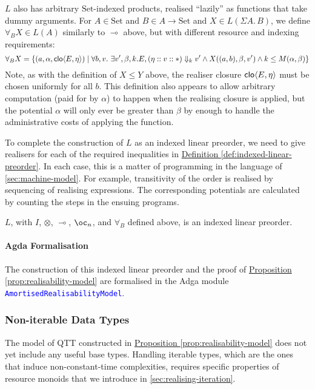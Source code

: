 \documentclass[acmsmall,review,screen,anonymous]{acmart}
\newcommand{\Set}{\mathrm{Set}}
\newcommand{\propref}[1]{\hyperref[#1]{Proposition \ref*{#1}}}
\newcommand{\defref}[1]{\hyperref[#1]{Definition \ref*{#1}}}
\newcommand{\AgdaModule}[1]{\textcolor{blue}{\tt #1}}
\begin{document}
$L$ also has arbitrary $\Set$-indexed products, realised ``lazily'' as
functions that take dummy arguments. For $A \in \Set$ and
$B \in A \to \Set$ and $X \in L(\Sigma A.\,B)$, we define
$\forall_B X \in L(A)$ similarly to $\multimap$ above, but with
different resource and indexing requirements:
\begin{displaymath}
  \forall_B X = \{ (a,\alpha,\mathsf{clo}\langle E , \eta \rangle) \mid \forall b, v.~\exists v', \beta, k. E, (\eta :: v :: *) \Downarrow_k v' \land X((a,b),\beta,v') \land k \leq M(\alpha,\beta) \}
\end{displaymath}
Note, as with the definition of $X \leq Y$ above, the realiser closure
$\mathsf{clo}\langle E , \eta \rangle$ must be chosen uniformly for all $b$. This definition
also appears to allow arbitrary computation (paid for by $\alpha$) to
happen when the realising closure is applied, but the potential
$\alpha$ will only ever be greater than $\beta$ by enough to handle
the administrative costs of applying the function.

To complete the construction of $L$ as an indexed linear preorder, we
need to give realisers for each of the required inequalities in
\defref{def:indexed-linear-preorder}. In each case, this is a matter
of programming in the language of \autoref{sec:machine-model}. For
example, transitivity of the order is realised by sequencing of
realising expressions. The corresponding potentials are calculated by
counting the steps in the ensuing programs.

\begin{proposition}\label{prop:realisability-model}
  $L$, with $I$, $\otimes$, $\multimap$, $\oc_n$, and $\forall_{B}$
  defined above, is an indexed linear preorder.
\end{proposition}

\paragraph{Agda Formalisation} The construction of this indexed linear
preorder and the proof of \propref{prop:realisability-model} are
formalised in the Adga module
\AgdaModule{AmortisedRealisabilityModel}.

\subsubsection{Non-iterable Data Types}
\label{sec:noniter-model}

The model of QTT constructed in \propref{prop:realisability-model}
does not yet include any useful base types. Handling iterable types,
which are the ones that induce non-constant-time complexities,
requires specific properties of resource monoids that we introduce in
\autoref{sec:realising-iteration}.
\end{document}
